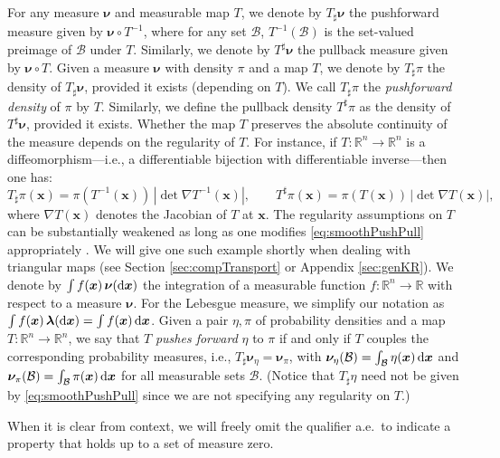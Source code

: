 \documentclass[twoside,11pt]{article}
\newcommand{\push}{_\sharp}                                      %
\newcommand{\lebm}{\boldsymbol{\lambda} } %
\newcommand{\genm}{\boldsymbol{\nu} }   %
\newcommand{\re}{\mathbb{R}}
\newcommand{\ra}{\rightarrow}
\newcommand{\Bc}{\mathcal{B}}
\newcommand{\xb}{\boldsymbol{x}}
\newcommand{\Bset}{ \Bc }
\newcommand{\pull}{^\sharp}
\begin{document}
For any measure $\genm$ and measurable map $T$, we denote by
$T\push \genm$ 
the pushforward measure given by $\genm \circ T^{-1}$, where for
any set $\Bset$, 
%
%
%
$T^{-1}(\Bset)$ is the set-valued preimage of $\Bset$ under $T$.
%
%
%
Similarly, we denote by
$T\pull \genm$ 
the pullback measure given by $\genm \circ T$.
%
Given %
a measure $\genm$
with
density $\pi$ and a %
map $T$, 
%
we denote
by $T\push \pi$ the density of $T\push \genm$, provided it exists (depending on $T$).
%
%
%
We call $T\push \pi$ the \emph{pushforward density} of $\pi$ by $T$.
Similarly, we define the pullback density 
$T\pull \pi$ as the density of $T\pull \genm$, provided it exists.
Whether the map $T$ preserves the absolute continuity of the measure 
depends
on the regularity of $T$.
For instance, if $T:\re^n \ra \re^n$ is a diffeomorphism---i.e., 
a differentiable bijection with differentiable inverse---then
%
%
%
one has: %
\begin{equation} \label{eq:smoothPushPull}
  T\push \pi(\xb) = \pi(T^{-1}(\xb))\,|\det \nabla T^{-1}(\xb)|,
  \qquad
  T\pull \pi(\xb) = \pi(T(\xb))\,|\det \nabla T(\xb)|,
\end{equation}
where $\nabla T(\xb)$ denotes the Jacobian of $T$ at $\xb$.
The regularity assumptions on $T$ can be substantially weakened as long as
one modifies
%
%
%
%
\eqref{eq:smoothPushPull} appropriately 
\citep{fremlin2000measure}.
%
We will give one such example shortly when dealing
with triangular maps 
(see Section \ref{sec:compTransport} or Appendix \ref{sec:genKR}).
%
We denote by  $\int f(\xb)\, \genm({\rm d}\xb)$ the
integration of a measurable function $f:\re^n \ra \re$ with
respect to a measure $\genm$.
For  
the Lebesgue measure, we simplify our notation as
%
$\int f(\xb)\, \lebm({\rm d}\xb) = \int f(\xb) \,{\rm d}\xb$. 
Given a pair $\eta,\pi$ of probability densities 
and a 
%
map $T:\re^n \ra \re^n$,
we say that $T$ \emph{pushes forward} 
%
%
$\eta$ to $\pi$ if and only if
$T$ couples the corresponding probability measures, i.e.,
$T\push \genm_{\eta} = \genm_{\pi}$, with
$\genm_{\eta}(\Bset) = \int_{\Bset} \eta(\xb)\,{\rm d}\xb$
and
$\genm_{\pi}(\Bset) = \int_{\Bset} \pi(\xb)\,{\rm d}\xb$ for all
measurable sets $\Bset$. 
(Notice that $T\push \eta$ need not be given  by \eqref{eq:smoothPushPull} since we are
not specifying any regularity on $T$.)

When it is clear from context, we will freely omit the qualifier 
a.e.\ to indicate a property that
holds up to a set of measure zero.
%
%
%
%
%
%
%
\end{document}
